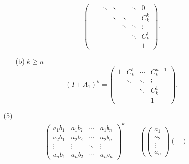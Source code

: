 \documentclass{article}
\begin{document}
\begin{enumerate}
\begin{enumerate}
\begin{enumerate}
\[\begin{pmatrix}
                          &           &  \ddots&     \ddots&        &  \ddots&  0\\
                          &           &        &     \ddots&  \ddots&        &  C_{k}^{k}\\
                          &           &        &           &  \ddots&  \ddots&  \vdots\\
                          &           &        &           &        &  \ddots&  C_{k}^{1}\\
                          &           &        &           &        &        &  1
                    \end{pmatrix}.
                \]
                \item [(b)]$k\geqslant n$
                \[
                    {(I+A_1)}^{k}=
                    \begin{pmatrix}
                        1 &  C_{k}^{1}&  \cdots&  C_{k}^{n-1}\\
                          &  \ddots   &  \ddots&     \vdots  \\
                          &           &  \ddots&  C_{k}^{1}  \\
                          &           &        &     1
                    \end{pmatrix}.
                \]
            \end{enumerate}
            \item [(5)]
            \begin{align*}
                {\begin{pmatrix}
                    a_{1}b_{1}& a_{1}b_{2}& \cdots &a_{1}b_{n}\\
                    a_{2}b_{1}& a_{2}b_{2}& \cdots &a_{2}b_{n}\\
                    \vdots & \vdots &\ddots &\vdots\\
                    a_{n}b_{1}& a_{n}b_{2}& \cdots &a_{n}b_{n}
                \end{pmatrix}}^{k}
                &=
                    {\left(
                        \begin{pmatrix}
                            a_1\\
                            a_2\\
                            \vdots\\
                            a_n
                        \end{pmatrix}
                        \begin{pmatrix}

\end{pmatrix}}
\end{align*}
\end{enumerate}
\end{enumerate}
\end{document}
